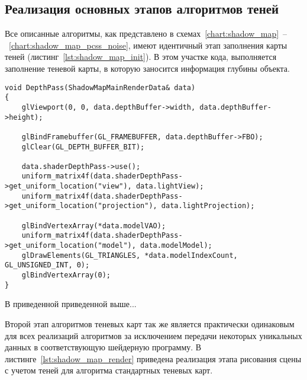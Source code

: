 \subsection{Реализация основных этапов алгоритмов теней}

Все описанные алгоритмы, как представлено в
схемах~\ref{chart:shadow_map}~--~\ref{chart:shadow_map_pcss_noise},
имеют идентичный этап заполнения карты теней (листинг~\ref{lst:shadow_map_init}).
В этом участке кода, выполняется заполнение теневой карты, в которую заносится
информация глубины объекта.

\begin{center}
\captionsetup{justification=centering, singlelinecheck=off}
\begin{lstlisting}[label=lst:shadow_map_init, caption=Алгоритм заполнения теневой карты]
void DepthPass(ShadowMapMainRenderData& data)
{
    glViewport(0, 0, data.depthBuffer->width, data.depthBuffer->height);

    glBindFramebuffer(GL_FRAMEBUFFER, data.depthBuffer->FBO);
    glClear(GL_DEPTH_BUFFER_BIT);

    data.shaderDepthPass->use();
    uniform_matrix4f(data.shaderDepthPass->get_uniform_location("view"), data.lightView);
    uniform_matrix4f(data.shaderDepthPass->get_uniform_location("projection"), data.lightProjection);

    glBindVertexArray(*data.modelVAO);
    uniform_matrix4f(data.shaderDepthPass->get_uniform_location("model"), data.modelModel);
    glDrawElements(GL_TRIANGLES, *data.modelIndexCount, GL_UNSIGNED_INT, 0);
    glBindVertexArray(0);
}
\end{lstlisting}
\end{center}

В приведенной приведенной выше...

Второй этап алгоритмов теневых карт так же является практически одинаковым для всех реализаций
алгоритмов за исключением передачи некоторых уникальных данных в соответствующую шейдерную
программу. В листинге~\ref{lst:shadow_map_render} приведена реализация этапа рисования сцены с учетом теней для
алгоритма стандартных теневых карт.

